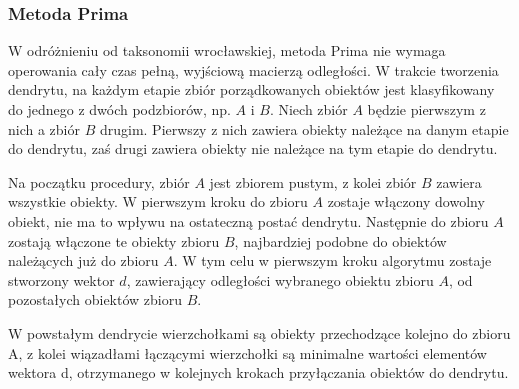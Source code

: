 \documentclass[12pt,a4paper]{report}
\begin{document}


\subsubsection{Metoda Prima}
\noindent

W odróżnieniu od taksonomii wrocławskiej, metoda Prima nie wymaga operowania cały czas pełną, wyjściową macierzą odległości. W trakcie tworzenia dendrytu, na każdym etapie zbiór porządkowanych obiektów jest klasyfikowany do jednego z dwóch podzbiorów, np. $A$ i $B$. Niech zbiór $A$ będzie pierwszym z nich a zbiór $B$ drugim. Pierwszy z nich zawiera obiekty należące na danym etapie do dendrytu, zaś drugi zawiera obiekty nie należące na tym etapie do dendrytu.

Na początku procedury, zbiór $A$ jest zbiorem pustym, z kolei zbiór $B$ zawiera wszystkie obiekty. W pierwszym kroku do zbioru $A$ zostaje włączony dowolny obiekt, nie ma to wpływu na ostateczną postać dendrytu. Następnie do zbioru $A$ zostają włączone te obiekty zbioru $B$, najbardziej podobne do obiektów należących już do zbioru $A$. W tym celu w pierwszym kroku algorytmu zostaje stworzony wektor $d$, zawierający odległości wybranego obiektu zbioru $A$, od pozostałych obiektów zbioru $B$.


W powstałym dendrycie wierzchołkami są obiekty przechodzące kolejno do zbioru A, z kolei wiązadłami łączącymi wierzchołki są minimalne wartości elementów wektora d, otrzymanego w kolejnych krokach przyłączania obiektów do dendrytu. 
\end{document}
